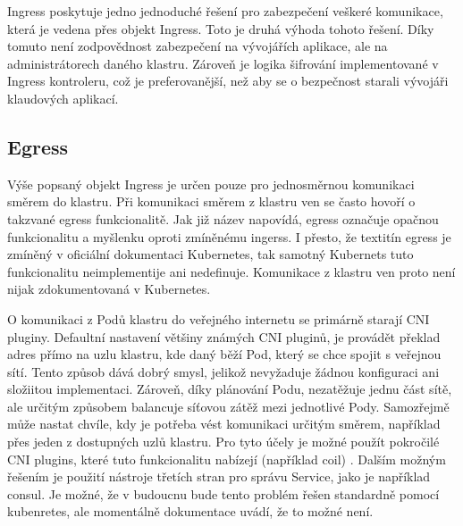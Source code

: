 Ingress poskytuje jedno jednoduché řešení pro zabezpečení veškeré komunikace, která je vedena přes objekt Ingress. Toto je druhá výhoda tohoto řešení. Díky tomuto není zodpovědnost zabezpečení na vývojářích aplikace, ale na administrátorech daného klastru. Zároveň je logika šifrování implementované v Ingress kontroleru, což je preferovanější, než aby se o bezpečnost starali vývojáři klaudových aplikací. \cite{koke_2023_bezpen}

\subsection{Egress}
Výše popsaný objekt Ingress je určen pouze pro jednosměrnou komunikaci směrem do klastru. Při komunikaci směrem z klastru ven se často hovoří o takzvané egress funkcionalitě. Jak již název napovídá, egress označuje opačnou funkcionalitu a myšlenku oproti zmíněnému ingerss. I přesto, že textitín egress je zmíněný v oficiální dokumentaci Kubernetes, tak samotný Kubernets tuto funkcionalitu neimplementije ani nedefinuje. Komunikace z klastru ven proto není nijak zdokumentovaná v Kubernetes.

O komunikaci z Podů klastru do veřejného internetu se primárně starají CNI pluginy. Defaultní nastavení většiny známých CNI pluginů, je provádět překlad adres přímo na uzlu klastru, kde daný běží Pod, který se chce spojit s veřejnou sítí. Tento způsob dává dobrý smysl, jelikož nevyžaduje žádnou konfiguraci ani složiitou implementaci. Zároveň, díky plánování Podu, nezatěžuje jednu část sítě, ale určitým způsobem balancuje síťovou zátěž mezi jednotlivé Pody. Samozřejmě může nastat chvíle, kdy je potřeba vést komunikaci určitým směrem, například přes jeden z dostupných uzlů klastru. Pro tyto účely je možné použít pokročilé CNI plugins, které tuto funkcionalitu nabízejí (například coil) \cite{yamamoto_2020_introducing}. Dalším možným řešením je použití nástroje třetích stran pro správu Service, jako je například consul. Je možné, že v budoucnu bude tento problém řešen standardně pomocí kubenretes, ale momentálně dokumentace uvádí, že to možné není. \cite{thekubernetesauthors_2022_network}



